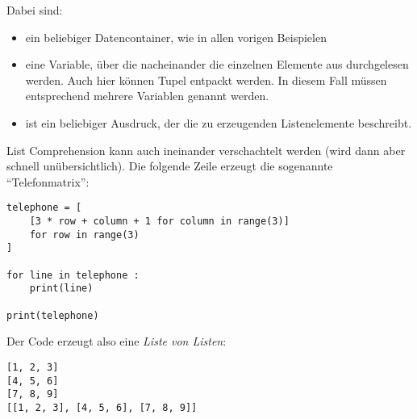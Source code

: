 Dabei sind:
\begin{itemize}
\item {} ein beliebiger Datencontainer, wie in allen vorigen Beispielen
\item {} eine Variable, über die nacheinander die einzelnen Elemente aus  durchgelesen werden. Auch hier können Tupel entpackt werden. In
	diesem Fall müssen entsprechend mehrere Variablen genannt werden.
\item {} ist ein beliebiger Ausdruck, der die zu erzeugenden Listenelemente beschreibt.
\end{itemize}

List Comprehension kann auch ineinander verschachtelt werden (wird dann aber schnell unübersichtlich). Die folgende Zeile erzeugt die sogenannte \enquote{Telefonmatrix}:

\begin{codebox}
\begin{verbatim}
telephone = [
    [3 * row + column + 1 for column in range(3)]
    for row in range(3)
]

for line in telephone :
    print(line)

print(telephone)
\end{verbatim}
\end{codebox}

Der Code erzeugt also eine \emph{Liste von Listen}:
\begin{cmdbox}
\begin{verbatim}
[1, 2, 3]
[4, 5, 6]
[7, 8, 9]
[[1, 2, 3], [4, 5, 6], [7, 8, 9]]
\end{verbatim}
\end{cmdbox}

